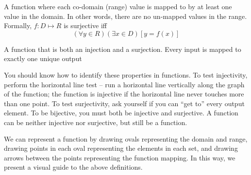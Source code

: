 \documentclass[main.tex]{subfiles}
\begin{document}
\begin{defn}
	A function where each co-domain (range) value is mapped to by at least one value in the domain. In other words, there are no un-mapped values in the range. Formally, \(f : D \mapsto R\) is surjective iff \[(\forall y \in R)(\exists x \in D)[y = f(x)]\]
\end{defn}

\begin{defn}
	A function that is both an injection and a surjection. Every input is mapped to exactly one unique output
\end{defn}

You should know how to identify these properties in functions. To test injectivity, perform the horizontal line test -- run a horizontal line vertically along the graph of the function; the function is injective if the horizontal line never touches more than one point. To test surjectivity, ask yourself if you can ``get to'' every output element. To be bijective, you must both be injective and surjective. A function can be neither injective nor surjective, but still be a function.

We can represent a function by drawing ovals representing the domain and range, drawing points in each oval representing the elements in each set, and drawing arrows between the points representing the function mapping. In this way, we present a visual guide to the above definitions.
\end{document}
